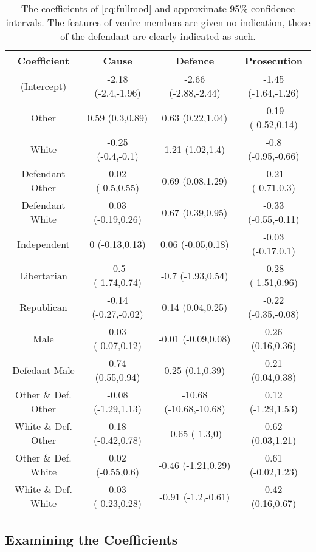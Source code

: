 \begin{table}[h!]
  \centering
  \caption[Final Model Coefficients and Confidence Intervals]{\footnotesize The coefficients of \ref{eq:fullmod}
    and approximate 95\% confidence intervals. The features of venire members are given no indication, those of the defendant are
    clearly indicated as such.}
  \label{tab:fullmodracecoef}
  \begin{tabular}{|c|c|c|c|} \hline
    Coefficient & Cause & Defence & Prosecution \\ \hline
    (Intercept) & -2.18 (-2.4,-1.96) & -2.66 (-2.88,-2.44) & -1.45 (-1.64,-1.26)\\
    Other & 0.59 (0.3,0.89) & 0.63 (0.22,1.04) & -0.19 (-0.52,0.14)\\
    White & -0.25 (-0.4,-0.1) & 1.21 (1.02,1.4) & -0.8 (-0.95,-0.66)\\
    Defendant Other & 0.02 (-0.5,0.55) & 0.69 (0.08,1.29) & -0.21 (-0.71,0.3)\\
    Defendant White & 0.03 (-0.19,0.26) & 0.67 (0.39,0.95) & -0.33 (-0.55,-0.11)\\
    Independent & 0 (-0.13,0.13) & 0.06 (-0.05,0.18) & -0.03 (-0.17,0.1)\\
    Libertarian & -0.5 (-1.74,0.74) & -0.7 (-1.93,0.54) & -0.28 (-1.51,0.96)\\
    Republican & -0.14 (-0.27,-0.02) & 0.14 (0.04,0.25) & -0.22 (-0.35,-0.08)\\
    Male & 0.03 (-0.07,0.12) & -0.01 (-0.09,0.08) & 0.26 (0.16,0.36)\\
    Defedant Male & 0.74 (0.55,0.94) & 0.25 (0.1,0.39) & 0.21 (0.04,0.38)\\
    Other \& Def. Other & -0.08 (-1.29,1.13) & -10.68 (-10.68,-10.68) & 0.12 (-1.29,1.53)\\
    White \& Def. Other & 0.18 (-0.42,0.78) & -0.65 (-1.3,0) & 0.62 (0.03,1.21)\\
    Other \& Def. White & 0.02 (-0.55,0.6) & -0.46 (-1.21,0.29) & 0.61 (-0.02,1.23)\\
    White \& Def. White & 0.03 (-0.23,0.28) & -0.91 (-1.2,-0.61) & 0.42 (0.16,0.67) \\ \hline
  \end{tabular}
\end{table}

\subsection{Examining the Coefficients} \label{sec:examcoef}


